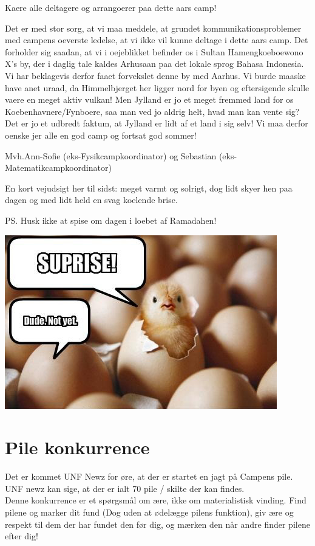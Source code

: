 \begin{minipage}[b]{0.95\linewidth}
\begin{minipage}[t]{0.47\textwidth}
Kaere alle deltagere og arrangoerer paa dette aars camp!

Det er med stor sorg, at vi maa meddele, at grundet kommunikationsproblemer med campens oeverste ledelse, at vi ikke vil kunne deltage i dette aars camp. 
Det forholder sig saadan, at vi i oejeblikket befinder os i Sultan Hamengkoeboewono X's by, der i daglig tale kaldes Arhusaan paa det lokale sprog Bahasa Indonesia. 
Vi har beklagevis derfor faaet forvekslet denne by med Aarhus. Vi burde maaske have anet uraad, da Himmelbjerget her ligger nord for byen og eftersigende skulle vaere en meget aktiv vulkan! Men Jylland er jo et meget fremmed land for os Koebenhavnere/Fynboere, saa man ved jo aldrig helt, hvad man kan vente sig? Det er jo et udbredt faktum, at Jylland er lidt af et land i sig selv!
Vi maa derfor oenske jer alle en god camp og fortsat god sommer!

Mvh.Ann-Sofie (eks-Fysikcampkoordinator) og Sebastian (eks-Matematikcampkoordinator)

En kort vejudsigt her til sidst: meget varmt og solrigt, dog lidt skyer hen paa dagen og med lidt held en svag koelende brise.

PS. Husk ikke at spise om dagen i loebet af Ramadahen!

\vspace{2mm}

\includegraphics[width=\linewidth]{suprise.jpg}

\vspace{-4mm}
\section*{Pile konkurrence}
Det er kommet UNF Newz for øre, at der er startet en jagt på Campens pile. UNF newz kan sige, at der er ialt 70 pile / skilte der kan findes. \\
Denne konkurrence er et spørgsmål om ære, ikke om materialistisk vinding. Find pilene og marker dit fund (Dog uden at ødelægge pilens funktion), giv ære og respekt til dem der har fundet den før dig, og mærken den når andre finder pilene efter dig!

\end{minipage}
\end{minipage}
